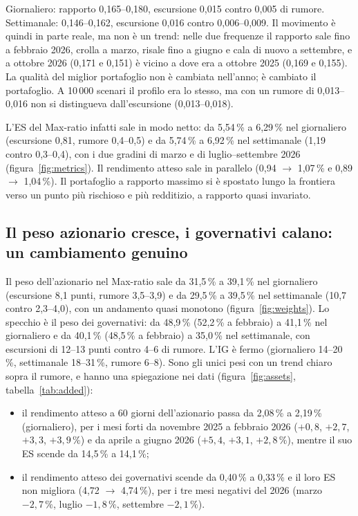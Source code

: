 \documentclass[11pt,a4paper]{article}
\begin{document}
Giornaliero: rapporto 0,165--0,180, escursione 0,015 contro 0,005 di rumore. Settimanale: 0,146--0,162, escursione 0,016 contro 0,006--0,009. Il movimento \`e quindi in parte reale, ma non \`e un trend: nelle due frequenze il rapporto sale fino a febbraio 2026, crolla a marzo, risale fino a giugno e cala di nuovo a settembre, e a ottobre 2026 (0,171 e 0,151) \`e vicino a dove era a ottobre 2025 (0,169 e 0,155). La qualit\`a del miglior portafoglio non \`e cambiata nell'anno; \`e cambiato il portafoglio. A 10\,000 scenari il profilo era lo stesso, ma con un rumore di 0,013--0,016 non si distingueva dall'escursione (0,013--0,018).

L'ES del Max-ratio infatti sale in modo netto: da 5,54\,\% a 6,29\,\% nel giornaliero (escursione 0,81, rumore 0,4--0,5) e da 5,74\,\% a 6,92\,\% nel settimanale (1,19 contro 0,3--0,4), con i due gradini di marzo e di luglio--settembre 2026 (figura~\ref{fig:metrics}). Il rendimento atteso sale in parallelo (0,94 $\to$ 1,07\,\% e 0,89 $\to$ 1,04\,\%). Il portafoglio a rapporto massimo si \`e spostato lungo la frontiera verso un punto pi\`u rischioso e pi\`u redditizio, a rapporto quasi invariato.

\subsection{Il peso azionario cresce, i governativi calano: un cambiamento genuino}

Il peso dell'azionario nel Max-ratio sale da 31,5\,\% a 39,1\,\% nel giornaliero (escursione 8,1 punti, rumore 3,5--3,9) e da 29,5\,\% a 39,5\,\% nel settimanale (10,7 contro 2,3--4,0), con un andamento quasi monotono (figura~\ref{fig:weights}). Lo specchio \`e il peso dei governativi: da 48,9\,\% (52,2\,\% a febbraio) a 41,1\,\% nel giornaliero e da 40,1\,\% (48,5\,\% a febbraio) a 35,0\,\% nel settimanale, con escursioni di 12--13 punti contro 4--6 di rumore. L'IG \`e fermo (giornaliero 14--20\,\%, settimanale 18--31\,\%, rumore 6--8). Sono gli unici pesi con un trend chiaro sopra il rumore, e hanno una spiegazione nei dati (figura~\ref{fig:assets}, tabella~\ref{tab:added}):

\begin{itemize}
\item il rendimento atteso a 60 giorni dell'azionario passa da 2,08\,\% a 2,19\,\% (giornaliero), per i mesi forti da novembre 2025 a febbraio 2026 ($+0{,}8$, $+2{,}7$, $+3{,}3$, $+3{,}9\,\%$) e da aprile a giugno 2026 ($+5{,}4$, $+3{,}1$, $+2{,}8\,\%$), mentre il suo ES scende da 14,5\,\% a 14,1\,\%;
\item il rendimento atteso dei governativi scende da 0,40\,\% a 0,33\,\% e il loro ES non migliora (4,72 $\to$ 4,74\,\%), per i tre mesi negativi del 2026 (marzo $-2{,}7\,\%$, luglio $-1{,}8\,\%$, settembre $-2{,}1\,\%$).
\end{itemize}
\end{document}
